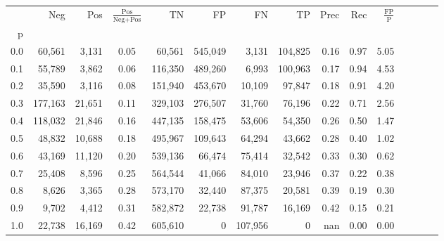 \begin{tabular}{rrrcrrrrrrrrrrr}
\toprule
{} &      Neg &     Pos & $\frac{\text{Pos}}{\text{Neg}+\text{Pos}}$ &       TN &       FP &       FN &       TP &  Prec &   Rec & $\frac{\text{FP}}{\text{P}}$ \\
p   &          &         &                                            &          &          &          &          &       &       &                              \\
\midrule
0.0 &   60,561 &   3,131 &                                       0.05 &   60,561 &  545,049 &    3,131 &  104,825 &  0.16 &  0.97 &                         5.05 \\
0.1 &   55,789 &   3,862 &                                       0.06 &  116,350 &  489,260 &    6,993 &  100,963 &  0.17 &  0.94 &                         4.53 \\
0.2 &   35,590 &   3,116 &                                       0.08 &  151,940 &  453,670 &   10,109 &   97,847 &  0.18 &  0.91 &                         4.20 \\
0.3 &  177,163 &  21,651 &                                       0.11 &  329,103 &  276,507 &   31,760 &   76,196 &  0.22 &  0.71 &                         2.56 \\
0.4 &  118,032 &  21,846 &                                       0.16 &  447,135 &  158,475 &   53,606 &   54,350 &  0.26 &  0.50 &                         1.47 \\
0.5 &   48,832 &  10,688 &                                       0.18 &  495,967 &  109,643 &   64,294 &   43,662 &  0.28 &  0.40 &                         1.02 \\
0.6 &   43,169 &  11,120 &                                       0.20 &  539,136 &   66,474 &   75,414 &   32,542 &  0.33 &  0.30 &                         0.62 \\
0.7 &   25,408 &   8,596 &                                       0.25 &  564,544 &   41,066 &   84,010 &   23,946 &  0.37 &  0.22 &                         0.38 \\
0.8 &    8,626 &   3,365 &                                       0.28 &  573,170 &   32,440 &   87,375 &   20,581 &  0.39 &  0.19 &                         0.30 \\
0.9 &    9,702 &   4,412 &                                       0.31 &  582,872 &   22,738 &   91,787 &   16,169 &  0.42 &  0.15 &                         0.21 \\
1.0 &   22,738 &  16,169 &                                       0.42 &  605,610 &        0 &  107,956 &        0 &   nan &  0.00 &                         0.00 \\
\bottomrule
\end{tabular}
